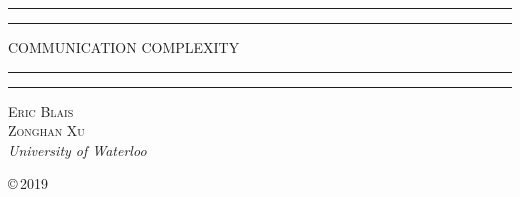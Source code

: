 \documentclass[11pt]{amsbook}
\theoremstyle{plain}
\theoremstyle{definition}
\theoremstyle{plain}
\begin{document}
\begin{titlepage}
\centering
\scshape
\vspace*{\baselineskip}

\rule{\textwidth}{1.6pt}\vspace*{-\baselineskip}\vspace*{2pt}
\rule{\textwidth}{0.4pt}

\vspace{0.75\baselineskip}
    {\LARGE COMMUNICATION COMPLEXITY\\}
\vspace{0.75\baselineskip}

\rule{\textwidth}{0.4pt}\vspace*{-\baselineskip}\vspace{3.2pt}
\rule{\textwidth}{1.6pt}

\vspace{2\baselineskip}

{\scshape\Large Eric Blais \\
 Zonghan Xu \\}
\vspace{\baselineskip}
\textit{University of Waterloo}
	
\vfill

\copyright\,2019
\end{titlepage}


\frontmatter

\tableofcontents

\mainmatter



















\end{document}
